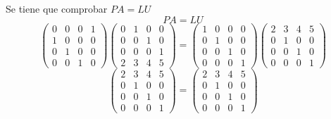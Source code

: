 Se tiene que comprobar $PA = LU$
\[ PA  =  LU\]
\[ 
    \left( \begin{array}{cccc}
    0 & 0 & 0 & 1\\ 
    1 & 0 & 0 & 0\\ 
    0 & 1 & 0 & 0\\
    0 & 0 & 1 & 0
    \end{array} \right)
    \left( \begin{array}{cccc}
    0 & 1 & 0 & 0\\
    0 & 0 & 1 & 0\\ 
    0 & 0 & 0 & 1\\ 
    2 & 3 & 4 & 5
    \end{array} \right) = 
    \left( \begin{array}{cccc}
    1 & 0 & 0 & 0\\
    0 & 1 & 0 & 0\\ 
    0 & 0 & 1 & 0\\ 
    0 & 0 & 0 & 1
    \end{array} \right)
    \left( \begin{array}{cccc}
    2 & 3 & 4 & 5\\
    0 & 1 & 0 & 0\\
    0 & 0 & 1 & 0\\
    0 & 0 & 0 & 1
    \end{array} \right)
\]
\[ 
    \left( \begin{array}{cccc}
    2 & 3 & 4 & 5\\
    0 & 1 & 0 & 0\\
    0 & 0 & 1 & 0\\
    0 & 0 & 0 & 1
    \end{array} \right) = 
    \left( \begin{array}{cccc}
    2 & 3 & 4 & 5\\
    0 & 1 & 0 & 0\\
    0 & 0 & 1 & 0\\
    0 & 0 & 0 & 1
    \end{array} \right)
\]